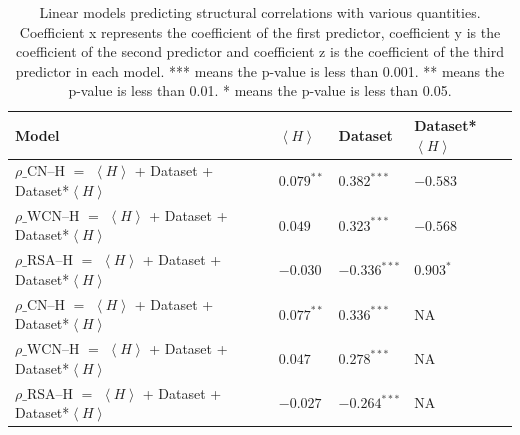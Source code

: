 \documentclass[12pt]{article}
\begin{document}
\begin{center}
	\begin{table}[H]
	\begin{tabular}{ | p{5.0cm} | p{3cm} | p{3cm} | p{4cm} | }
	\hline
	Model & $\left \langle H \right \rangle$  & Dataset & Dataset*$\left \langle H \right \rangle$ \\	
	\hline
	$\rho  \text{\_CN--H}$   $ = $  $\left \langle H \right \rangle$ + Dataset + Dataset*$\left \langle H \right \rangle$ & $0.079 ^{**}$ & $0.382^{***}$  & $-0.583$   \\[1.2cm] 
		
	$\rho  \text{\_WCN--H}$  $ = $  $\left \langle H \right \rangle$ + Dataset + Dataset*$\left \langle H \right \rangle$& $0.049$ & $0.323^{***}$ & $-0.568$  \\[1.2cm] 	 
	 
	$\rho  \text{\_RSA--H}$  $ = $ $\left \langle H \right \rangle$ + Dataset + Dataset*$\left \langle H \right \rangle$ &  $-0.030$ & $-0.336^{***}$ & $0.903^{*}$ \\[1.2cm]

	$\rho  \text{\_CN--H}$   $ = $  $\left \langle H \right \rangle$ + Dataset + Dataset*$\left \langle H \right \rangle$ & $0.077^{**}$ & $0.336^{***}$  & NA  \\[1.2cm] 
		
	$\rho  \text{\_WCN--H}$  $ = $  $\left \langle H \right \rangle$ + Dataset + Dataset*$\left \langle H \right \rangle$& $ 0.047$ & $0.278^{***}$ & NA  \\[1.2cm] 	 
	 
	$\rho  \text{\_RSA--H}$  $ = $ $\left \langle H \right \rangle$ + Dataset + Dataset*$\left \langle H \right \rangle$ &  $-0.027$ & $ -0.264^{***}$ & NA \\
		
	
	
	
	\hline
	\end{tabular}
	\caption{Linear models predicting structural correlations with various quantities. Coefficient x represents the coefficient of the first predictor, coefficient y is the coefficient of the second predictor and coefficient z is the coefficient of the third predictor in each model.  *** means the p-value is less than 0.001. ** means the p-value is less than 0.01.  * means the p-value is less than 0.05. }
	\label{table:model_stats}
	\end{table}
\end{center}
\end{document}
